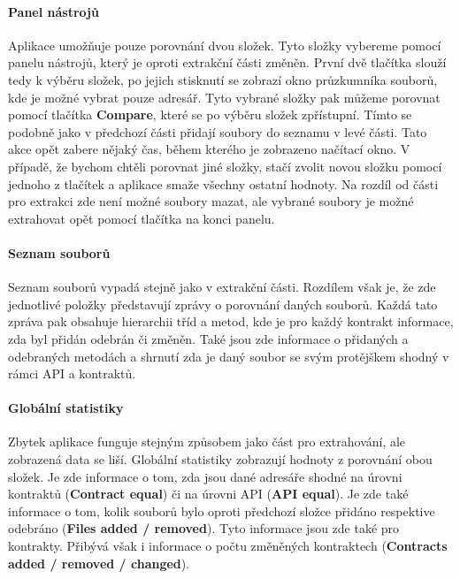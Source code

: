 		\paragraph{Panel nástrojů}	
			Aplikace umožňuje pouze porovnání dvou složek. Tyto složky vybereme pomocí panelu nástrojů, který je oproti extrakční části změněn. První dvě tlačítka slouží tedy k výběru složek, po jejich stisknutí se zobrazí okno průzkumníka souborů, kde je možné vybrat pouze adresář. Tyto vybrané složky pak můžeme porovnat pomocí tlačítka \textbf{Compare}, které se po výběru složek zpřístupní. Tímto se podobně jako v předchozí části přidají soubory do seznamu v levé části. Tato akce opět zabere nějaký čas, během kterého je zobrazeno načítací okno. V případě, že bychom chtěli porovnat jiné složky, stačí zvolit novou složku pomocí jednoho z tlačítek a aplikace smaže všechny ostatní hodnoty. Na rozdíl od části pro extrakci zde není možné soubory mazat, ale vybrané soubory je možné extrahovat opět pomocí tlačítka na konci panelu.\\
		
		\paragraph{Seznam souborů}
			Seznam souborů vypadá stejně jako v extrakční části. Rozdílem však je, že zde jednotlivé položky představují zprávy o porovnání daných souborů. Každá tato zpráva pak obsahuje hierarchii tříd a metod, kde je pro každý kontrakt informace, zda byl přidán odebrán či změněn. Také jsou zde informace o přidaných a odebraných metodách a shrnutí zda je daný soubor se svým protějškem shodný v rámci API a kontraktů.
		
		\paragraph{Globální statistiky}
			Zbytek aplikace funguje stejným způsobem jako část pro extrahování, ale zobrazená data se liší. Globální statistiky zobrazují hodnoty z porovnání obou složek. Je zde informace o tom, zda jsou dané adresáře shodné na úrovni kontraktů (\textbf{Contract equal}) či na úrovni API (\textbf{API equal}). Je zde také informace o tom, kolik souborů bylo oproti předchozí složce přidáno respektive odebráno (\textbf{Files added / removed}). Tyto informace jsou zde také pro kontrakty. Přibývá však i informace o počtu změněných kontraktech (\textbf{Contracts added / removed / changed}).\\
		
